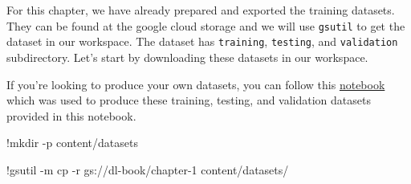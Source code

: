 \documentclass[
  letterpaper,
  DIV=11,
  numbers=noendperiod]{scrreprt}
\newenvironment{Shaded}{\begin{snugshade}}{\end{snugshade}}
\newcommand{\DecValTok}[1]{\textcolor[rgb]{0.68,0.00,0.00}{#1}}
\newcommand{\NormalTok}[1]{\textcolor[rgb]{0.00,0.23,0.31}{#1}}
\newcommand{\OperatorTok}[1]{\textcolor[rgb]{0.37,0.37,0.37}{#1}}
\begin{document}
For this chapter, we have already prepared and exported the training
datasets. They can be found at the google cloud storage and we will use
\texttt{gsutil} to get the dataset in our workspace. The dataset has
\texttt{training}, \texttt{testing}, and \texttt{validation}
subdirectory. Let's start by downloading these datasets in our
workspace.

If you're looking to produce your own datasets, you can follow this
\href{https://colab.research.google.com/drive/1LCFLeSCu969wIW8TD68-j4hfIu7WiRIK?usp=sharing}{notebook}
which was used to produce these training, testing, and validation
datasets provided in this notebook.

\begin{Shaded}
\begin{Highlighting}[]
\OperatorTok{!}\NormalTok{mkdir }\OperatorTok{{-}}\NormalTok{p content}\OperatorTok{/}\NormalTok{datasets}
\end{Highlighting}
\end{Shaded}

\begin{Shaded}
\begin{Highlighting}[]
\OperatorTok{!}\NormalTok{gsutil }\OperatorTok{{-}}\NormalTok{m cp }\OperatorTok{{-}}\NormalTok{r gs:}\OperatorTok{//}\NormalTok{dl}\OperatorTok{{-}}\NormalTok{book}\OperatorTok{/}\NormalTok{chapter}\OperatorTok{{-}}\DecValTok{1}\NormalTok{ content}\OperatorTok{/}\NormalTok{datasets}\OperatorTok{/}
\end{Highlighting}
\end{Shaded}
\end{document}
